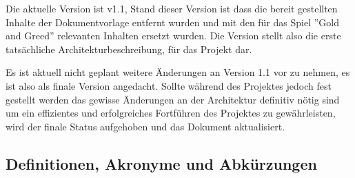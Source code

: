 \documentclass[fontsize=12pt,paper=a4,twoside]{scrartcl}
\begin{document}
Die aktuelle Version ist v1.1, Stand dieser Version ist dass die bereit gestellten Inhalte der Dokumentvorlage entfernt wurden und mit den für das Spiel ''Gold and Greed'' relevanten Inhalten ersetzt wurden. Die Version stellt also die erste tatsächliche Architekturbeschreibung, für das Projekt dar.

Es ist aktuell nicht geplant weitere Änderungen an Version 1.1 vor zu nehmen, es ist also als finale Version angedacht. Sollte während des Projektes jedoch fest gestellt werden das gewisse Änderungen an der Architektur definitiv nötig sind um ein effizientes und erfolgreiches Fortführen des Projektes zu gewährleisten, wird der finale Status aufgehoben und das Dokument aktualisiert.

  
\subsection{Definitionen, Akronyme und Abkürzungen}
\end{document}
